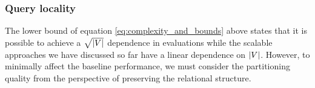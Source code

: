
\subsubsection{Query locality}
The lower bound of equation \eqref{eq:complexity_and_bounds} above states that it is possible to achieve a $\sqrt{\mathopen{}\left|V\right|}$ dependence in evaluations while the scalable approaches we have discussed so far have a linear dependence on ${\mathopen{}\left|V\right|}$. 
However, to minimally affect the baseline performance, we must consider the partitioning quality from the perspective of preserving the relational structure. 

